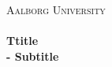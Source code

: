 \begin{titlingpage}\centering

\textsc{\LARGE Aalborg University}\\[0.3cm]

\HRule \\[0.4cm]
{\huge \bfseries Ttitle}\\[0.5cm]
{\Large \bfseries - Subtitle}

\HRule \\[2cm]

\begin{minipage}{\columnwidth}
\end{minipage}


\end{titlingpage}

